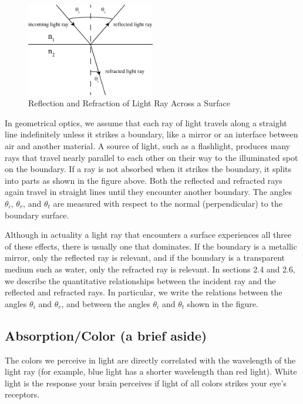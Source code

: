 \begin{figure}[h]
    \begin{center}
        \includegraphics[width=0.5\textwidth]{./Exp6/pic/basicsnelllaw.png}
    \end{center}
    \caption{Reflection and Refraction of Light Ray Across a Surface}
    \label{fig:rayref}
\end{figure}
 
In geometrical optics, we assume that each ray of light travels along a straight line indefinitely unless it strikes a boundary, like a mirror or an interface between air and another material. A source of light, such as a flashlight, produces many rays that travel nearly parallel to each other on their way to the illuminated spot on the boundary. If a ray is not absorbed when it strikes the boundary, it splits into parts as shown in the figure above. Both the reflected and refracted rays again travel in straight lines until they encounter another boundary. The angles $\theta_{i}$, $\theta_{r}$, and $\theta_{t}$ are measured with respect to the normal (perpendicular) to the boundary surface.\myskip

Although in actuality a light ray that encounters a surface experiences all three of these effects, there is usually one that dominates. If the boundary is a metallic mirror, only the reflected ray is relevant, and if the boundary is a transparent medium such as water, only the refracted ray is relevant. In sections 2.4 and 2.6, we describe the quantitative relationships between the incident ray and the reflected and refracted rays. In particular, we write the relations between the angles $\theta_{i}$ and $\theta_{r}$, and between the angles $\theta_{i}$ and $\theta_{t}$ shown in the figure. 

\subsection{Absorption/Color (a brief aside)}

The colors we perceive in light are directly correlated with the wavelength of the light ray (for example, blue light has a shorter wavelength than red light). White light is the response your brain perceives if light of all colors strikes your eye's receptors.  \myskip

